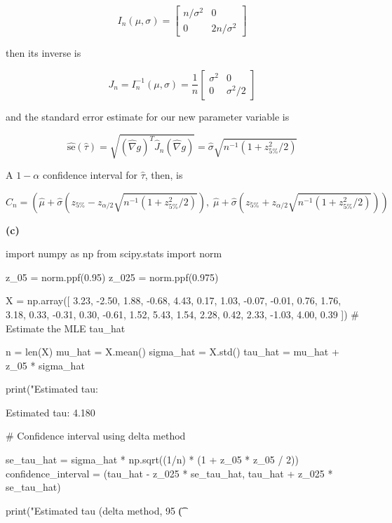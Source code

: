 \[ I_{n}(\mu, \sigma) = \begin{bmatrix}
n / \sigma^{2} & 0 \\
0 & 2n / \sigma^{2}
\end{bmatrix}
\]

then its inverse is

\[ J_{n} = I_{n}^{-1}(\mu, \sigma) = \frac{1}{n} \begin{bmatrix}
\sigma^{2} & 0 \\
0 & \sigma^{2}/2
\end{bmatrix}
\]

and the standard error estimate for our new parameter variable is

\[\hat{\text{se}}(\hat{\tau}) = \sqrt{(\hat{\nabla} g)^T \hat{J}_{n} (\hat{\nabla} g)} = \hat{\sigma} \sqrt{n^{-1}(1 + z_{5\%}^{2} / 2)}\]

A \(1 - \alpha\) confidence interval for \(\hat{\tau}\), then, is

\[ C_{n} = \left(
\hat{\mu} + \hat{\sigma}\left( z_{5\%} - z_{\alpha / 2} \sqrt{n^{-1}(1 + z_{5\%}^{2} / 2)} \right), \;
\hat{\mu} + \hat{\sigma}\left( z_{5\%} + z_{\alpha / 2} \sqrt{n^{-1}(1 + z_{5\%}^{2} / 2)} \right) \right) \]

\textbf{(c)}

\begin{python}
import numpy as np
from scipy.stats import norm

z_{0}5 = norm.ppf(0.95)
z_{0}25 = norm.ppf(0.975)
\end{python}

\begin{python}
X = np.array([
    3.23, -2.50,  1.88, -0.68,  4.43, 0.17,
    1.03, -0.07, -0.01,  0.76,  1.76, 3.18,
    0.33, -0.31,  0.30, -0.61,  1.52, 5.43,
    1.54,  2.28,  0.42,  2.33, -1.03, 4.00,
    0.39   
])
# Estimate the MLE tau_hat

n = len(X)
mu_hat = X.mean()
sigma_hat = X.std()
tau_hat = mu_hat + z_{0}5 * sigma_hat

print("Estimated tau: %
\end{python}

\begin{console}
Estimated tau: 4.180
\end{console}

\begin{python}
# Confidence interval using delta method

se_tau_hat = sigma_hat * np.sqrt((1/n) * (1 + z_{0}5 * z_{0}5 / 2))
confidence_{i}nterval = (tau_hat - z_{0}25 * se_tau_hat, 
                         tau_hat + z_{0}25 * se_tau_hat)

print("Estimated tau (delta method, 95%
       \t (%
\end{python}

